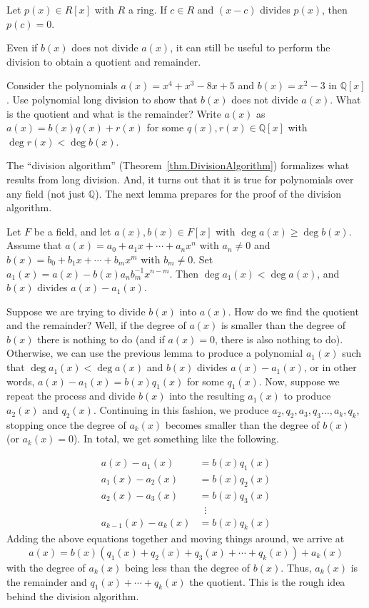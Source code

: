 \begin{theorem}\label{thm.LinearFactorOfPolyImpliesRoot}
Let $p(x)\in R[x]$ with $R$ a ring. If $c\in R$ and $(x-c)$ divides $p(x)$, then $p(c) = 0$.
\end{theorem}

Even if $b(x)$ does not divide $a(x)$, it can still be useful to perform the division to obtain a quotient and remainder.

\begin{problem}
Consider the polynomials $a(x) = x^4+x^3-8x +5$  and $b(x) = x^2 -3$ in $\mathbb{Q}[x]$. Use polynomial long division to show that $b(x)$ does not divide $a(x)$. What is the quotient and what is the remainder? Write $a(x)$ as $a(x) = b(x)q(x) + r(x)$ for some $q(x),r(x)\in \mathbb{Q}[x]$ with $\deg r(x) < \deg b(x)$.
\end{problem}

The ``division algorithm'' (Theorem~\ref{thm.DivisionAlgorithm}) formalizes what results from long division. And, it turns out that it is true for polynomials over any field (not just $\mathbb{Q}$). The next lemma prepares for the proof of the division algorithm. 

\begin{lemma}
Let $F$ be a field, and let $a(x),b(x)\in F[x]$ with $\deg a(x)\ge \deg b(x)$. Assume that $a(x) = a_0 + a_1x + \cdots + a_nx^n$ with $a_n\neq 0$ and $b(x) = b_0 + b_1x + \cdots + b_mx^m$ with $b_m\neq 0$. Set $a_1(x) =  a(x) - b(x)a_nb_m^{-1}x^{n-m}$. Then $\deg a_1(x) < \deg a(x)$, and $b(x)$ divides $a(x) - a_1(x)$.
\end{lemma}

Suppose we are trying to divide $b(x)$ into $a(x)$. How do we find the quotient and the remainder? Well, if the degree of $a(x)$ is smaller than the degree of $b(x)$ there is nothing to do (and if $a(x) = 0$, there is also nothing to do). Otherwise, we can use the previous lemma to produce a polynomial $a_1(x)$ such that $\deg a_1(x) < \deg a(x)$ and $b(x)$ divides $a(x) - a_1(x)$, or in other words, $a(x) - a_1(x) = b(x)q_1(x)$ for some $q_1(x)$. Now, suppose we repeat the process and divide $b(x)$ into the resulting $a_1(x)$ to produce $a_2(x)$ and $q_2(x)$. Continuing in this fashion, we produce $a_2, q_2, a_3,q_3 \ldots, a_k,q_k$, stopping once the degree of $a_k(x)$ becomes smaller than the degree of $b(x)$ (or $a_k(x)=0$). In total, we get something like the following.

\begin{align*}
a(x) - a_1(x) & = b(x)q_1(x)\\
a_1(x) - a_2(x) & = b(x)q_2(x)\\
a_2(x) - a_3(x) & = b(x)q_3(x)\\
& \;\;\vdots\\ 
a_{k-1}(x) - a_{k}(x) & = b(x)q_k(x)
\end{align*}
Adding the above equations together and moving things around, we arrive at  \[a(x) = b(x)\left(q_1(x) + q_2(x) + q_3(x) +\cdots + q_k(x)\right) + a_k(x)\]
with the degree of $a_k(x)$ being less than the degree of $b(x)$. Thus, $a_k(x)$  is the remainder and $q_1(x) +\cdots + q_k(x)$ the quotient. This is the rough idea behind the division algorithm.

